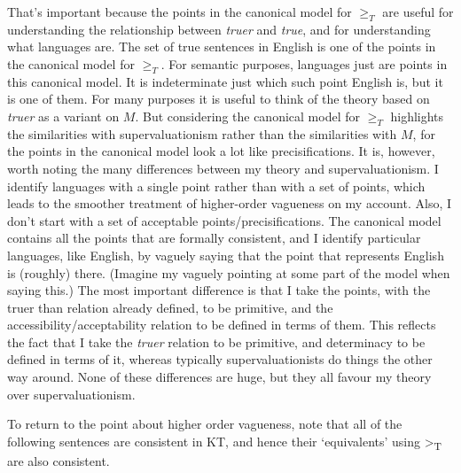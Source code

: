That's important because the points in the canonical model for \(\geqslant _T\) are useful for understanding the relationship between \textit{truer} and \textit{true}, and for understanding what languages are. The set of true sentences in English is one of the points in the canonical model for \(\geqslant _T\). For semantic purposes, languages just are points in this canonical model. It is indeterminate just which such point English is, but it is one of them. For many purposes it is useful to think of the theory based on \textit{truer} as a variant on \(M\). But considering the canonical model for \(\geqslant _T\) highlights the similarities with supervaluationism rather than the similarities with \(M\), for the points in the canonical model look a lot like precisifications. It is, however, worth noting the many differences between my theory and supervaluationism. I identify languages with a single point rather than with a set of points, which leads to the smoother treatment of higher-order vagueness on my account. Also, I don't start with a set of acceptable points/precisifications. The canonical model contains all the points that are formally consistent, and I identify particular languages, like English, by vaguely saying that the point that represents English is (roughly) there. (Imagine my vaguely pointing at some part of the model when saying this.) The most important difference is that I take the points, with the truer than relation already defined, to be primitive, and the accessibility/acceptability relation to be defined in terms of them. This reflects the fact that I take the \textit{truer} relation to be primitive, and determinacy to be defined in terms of it, whereas typically supervaluationists do things the other way around. None of these differences are huge, but they all favour my theory over supervaluationism. 

To return to the point about higher order vagueness, note that all of the following sentences are consistent in KT, and hence their `equivalents' using {\textgreater}\textsubscript{T} are also consistent.

